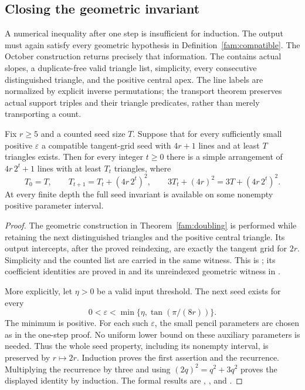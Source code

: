 \subsection{Closing the geometric invariant}

A numerical inequality after one step is insufficient for induction. The
output must again satisfy every geometric hypothesis in
Definition~\ref{fam:compatible}. The October construction returns precisely
that information. The 
contains actual slopes, a duplicate-free valid triangle list, simplicity,
every consecutive distinguished triangle, and the positive central apex.
The line labels are normalized by explicit inverse permutations; the
transport theorem preserves actual support triples and their triangle
predicates, rather than merely transporting a count.

\begin{theorem}\label{fam:closed-iteration}
Fix $r\ge5$ and a counted seed size $T$. Suppose that for every sufficiently
small positive $\varepsilon$ a compatible tangent-grid seed with $4r+1$
lines and at least $T$ triangles exists. Then for every integer $t\ge0$
there is a simple arrangement of $4r\,2^t+1$ lines with at least $T_t$
triangles, where
\begin{equation}
 T_0=T,\qquad T_{t+1}=T_t+(4r\,2^t)^2,
 \qquad 3T_t+(4r)^2=3T+(4r\,2^t)^2.
 \label{fam:closed-count}
\end{equation}
At every finite depth the full seed invariant is available on some
nonempty positive parameter interval.
\end{theorem}

\begin{proof}
The geometric construction in Theorem~\ref{fam:doubling} is performed
while retaining the next distinguished triangles and the positive central
triangle. Its output intercepts, after the proved reindexing, are exactly
the tangent grid for $2r$. Simplicity and the counted list are carried in
the same witness. This is
; its
coefficient identities are proved in  and its
unreindexed geometric witness in .

More explicitly, let $\eta>0$ be a valid input threshold. The next seed
exists for every
\[
 0<\varepsilon<\min\{\eta,\tan(\pi/(8r))\}.
\]
The minimum is positive. For each such $\varepsilon$, the small pencil
parameters are chosen as in the one-step proof. No uniform lower bound
on these auxiliary parameters is needed. Thus the whole seed property,
including its nonempty interval, is preserved by $r\mapsto2r$.
Induction proves the first assertion and the recurrence. Multiplying
the recurrence by three and using $(2q)^2=q^2+3q^2$ proves the displayed
identity by induction. The formal results are
,
, and
.
\end{proof}

